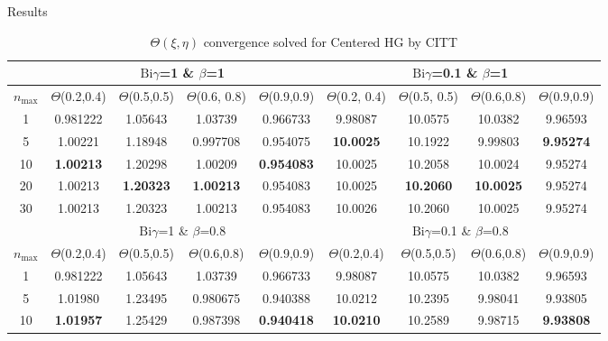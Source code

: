 \documentclass[english,landscape,xcolor=dvipsnames,aspectratio=169]{beamer}
\newcommand{\Bi}{\mathrm{Bi}}
\newcommand{\nmax}{n_{\max}}
\begin{document}
\begin{frame}{Results}
\tiny
\begin{table}[h!]
\caption{$\Theta(\xi,\eta)$ convergence solved for Centered HG by CITT}\vspace{-.7em} %
\centering
\setlength\tabcolsep{1.5pt}
\renewcommand\arraystretch{1}
	\begin{tabular}{|c|c|c|c|c|c|c|c|c|}%
		\hline
		&\multicolumn{4}{|c|}{$\Bi\gamma$=1 \& $\beta$=1}& \multicolumn{4}{c|}{$\Bi\gamma$=0.1 \& $\beta$=1} \\ \hline
		$\nmax$ &$\Theta$(0.2,0.4)& $\Theta$(0.5,0.5)&  $\Theta$(0.6, 0.8)& $\Theta$(0.9,0.9)&$\Theta$(0.2, 0.4)& $\Theta$(0.5, 0.5)&$\Theta$(0.6,0.8)& $\Theta$(0.9,0.9) \\\hline
		1 &          0.981222 & 1.05643 & 1.03739 & 0.966733  & 9.98087 & 10.0575 & 10.0382 & 9.96593 \\
		5 &          1.00221 & 1.18948 & 0.997708 & 0.954075  &  \bfseries 10.0025 & 10.1922 & 9.99803 &   \bfseries 9.95274 \\
		10 & \bfseries 1.00213 & 1.20298 & 1.00209 &  \bfseries 0.954083  & 10.0025 & 10.2058 & 10.0024 & 9.95274 \\
		20 & 1.00213 &  \bfseries 1.20323 &  \bfseries 1.00213 & 0.954083  & 10.0025 &  \bfseries 10.2060 &  \bfseries  10.0025 & 9.95274 \\
		30 & 1.00213 & 1.20323 & 1.00213 & 0.954083  & 10.0026 & 10.2060 & 10.0025 & 9.95274 \\
		\hline
		&\multicolumn{4}{|c|}{$\Bi\gamma$=1 \& $\beta$=0.8} & \multicolumn{4}{c|}{$\Bi\gamma$=0.1 \& $\beta$=0.8} \\ \hline
		$\nmax$ & $\Theta$(0.2,0.4)& $\Theta$(0.5,0.5)&  $\Theta$(0.6,0.8)& $\Theta$(0.9,0.9) & $\Theta$(0.2,0.4)& $\Theta$(0.5,0.5)&$\Theta$(0.6,0.8)& $\Theta$(0.9,0.9)\\ \hline
		1 & 0.981222 & 1.05643 & 1.03739 & 0.966733 & 9.98087 & 10.0575 & 10.0382 & 9.96593 \\
		5 & 1.01980 & 1.23495 & 0.980675 & 0.940388 & 10.0212 & 10.2395 & 9.98041 & 9.93805 \\
		10 & \bfseries  1.01957 & 1.25429 & 0.987398 & \bfseries  0.940418  &  \bfseries 10.0210 & 10.2589 & 9.98715 &  \bfseries 9.93808 \\

\end{tabular}
\end{table}
\end{frame}
\end{document}
